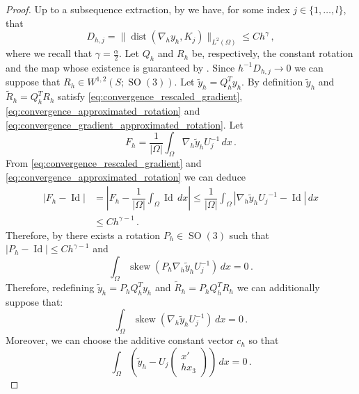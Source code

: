 \documentclass{article}
\theoremstyle{plain}
\theoremstyle{plain}
\theoremstyle{plain}
\theoremstyle{plain}
\theoremstyle{plain}
\theoremstyle{definition}
\theoremstyle{definition}
\newcommand{\dint}{\displaystyle\int}
\DeclareMathOperator{\Id}{Id}
\DeclareMathOperator{\SO}{SO}
\DeclareMathOperator{\skw}{skew}
\DeclareMathOperator{\dist}{dist}
\begin{document}
\begin{proof}
    Up to a subsequence extraction, by  we have, for some index $j \in \{1, \dots, l\}$, that 
    \[
        D_{h, j} = \|\dist(\nabla_h y_h, K_j) \|_{L^2(\Omega)} \leq Ch^{\gamma} \,,
    \]
    where we recall that $\gamma = \frac{\alpha}{2}$. Let $Q_h$ and $R_h$ be, respectively, the constant rotation and the map whose existence is guaranteed by . Since $h^{-1}D_{h, j} \to 0$ we can suppose that $R_h \in W^{1,2}(S; \SO(3))$. Let $\tilde y_h = Q_h^T y_h $. By definition $\tilde y_h$ and $\tilde R_h = Q_h^T R_h$ satisfy \eqref{eq:convergence_rescaled_gradient}, \eqref{eq:convergence_approximated_rotation} and \eqref{eq:convergence_gradient_approximated_rotation}. Let
    \begin{equation}
        F_h = \dfrac{1}{|\Omega|}\dint_{\Omega} \nabla_h \tilde y_h {U}^{-1}_j \, dx \,.
    \end{equation}
    From \eqref{eq:convergence_rescaled_gradient} and \eqref{eq:convergence_approximated_rotation} we can deduce
    \begin{align}
        |F_h - \Id| & = \left|F_h - \dfrac{1}{|\Omega|}\int_{\Omega} \Id \, dx \right| \leq \dfrac{1}{|\Omega|}\int_{\Omega} |\nabla_h \tilde y_h {U_j}^{-1} - \Id| \, dx \\
        & \leq Ch^{\gamma -1} \,.
    \end{align}
    Therefore, by  there exists a rotation $P_h \in \SO(3)$ such that $|P_h - \Id| \leq Ch^{\gamma -1}$ and
    \begin{equation}
        \int_{\Omega} \skw\left(P_h \nabla_h \tilde y_h  {U}_j^{-1}\right) \, dx = 0 \,.
    \end{equation}
    Therefore, redefining $\tilde y_h = P_h Q_h^T y_h$ and $\tilde R_h = P_h Q_h^T R_h$ we can additionally suppose that:
    \begin{equation}
        \int_{\Omega} \skw\left(\nabla_h \tilde y_h {U}_j^{-1}\right) \, dx = 0 \,. \label{eq:korn_condition}
    \end{equation}
    Moreover, we can choose the additive constant vector $c_h$ so that
    \begin{equation}
        \int_\Omega \left(\tilde y_h - U_j \begin{pmatrix}
            x' \\ h x_3
        \end{pmatrix}
        \right) \, dx = 0 \,. \label{eq:poincare_wirtinger_condition}

\end{equation}
\end{proof}
\end{document}
